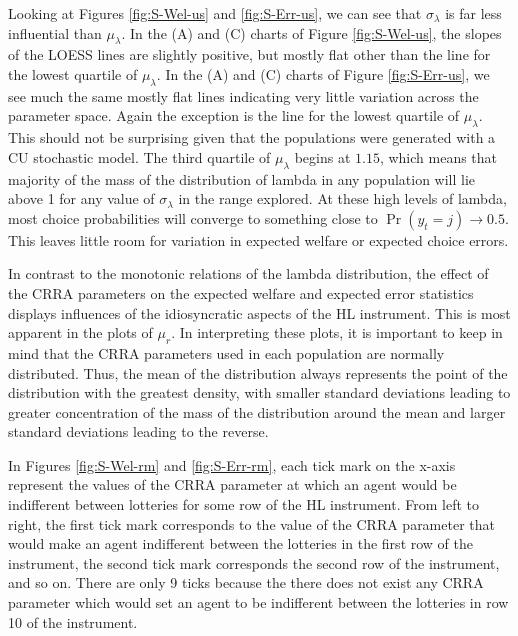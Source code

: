 \documentclass[../main.tex]{subfiles}
\begin{document}
\addtocounter{footnote}{-1}

Looking at Figures \ref{fig:S-Wel-us} and \ref{fig:S-Err-us}, we can see that $\sigma_\lambda$ is far less influential than $\mu_\lambda$.
In the (A) and (C) charts of Figure \ref{fig:S-Wel-us}, the slopes of the LOESS lines are slightly positive, but mostly flat other than the line for the lowest quartile of $\mu_\lambda$.
In the (A) and (C) charts of Figure \ref{fig:S-Err-us}, we see much the same mostly flat lines indicating very little variation across the parameter space.
Again the exception is the line for the lowest quartile of $\mu_\lambda$.
This should not be surprising given that the populations were generated with a CU stochastic model.
The third quartile of $\mu_\lambda$ begins at $1.15$, which means that majority of the mass of the distribution of lambda in any population will lie above 1 for any value of $\sigma_\lambda$ in the range explored.
At these high levels of lambda, most choice probabilities will converge to something close to $\Pr( y_t = j) \to 0.5$.
This leaves little room for variation in expected welfare or expected choice errors.

In contrast to the monotonic relations of the lambda distribution, the effect of the CRRA parameters on the expected welfare and expected error statistics displays influences of the idiosyncratic aspects of the HL instrument.
This is most apparent in the plots of $\mu_r$.
In interpreting these plots, it is important to keep in mind that the CRRA parameters used in each population are normally distributed.
Thus, the mean of the distribution always represents the point of the distribution with the greatest density, with smaller standard deviations leading to greater concentration of the mass of the distribution around the mean and larger standard deviations leading to the reverse.

In Figures \ref{fig:S-Wel-rm} and \ref{fig:S-Err-rm}, each tick mark on the x-axis represent the values of the CRRA parameter at which an agent would be indifferent between lotteries for some row of the HL instrument.
From left to right, the first tick mark corresponds to the value of the CRRA parameter that would make an agent indifferent between the lotteries in the first row of the instrument, the second tick mark corresponds the second row of the instrument, and so on.
There are only 9 ticks because the there does not exist any CRRA parameter which would set an agent to be indifferent between the lotteries in row 10 of the instrument.
\end{document}
